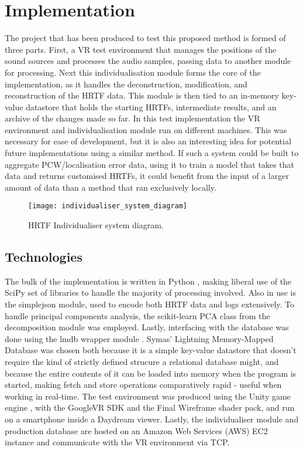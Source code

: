 \section{Implementation}
The project that has been produced to test this proposed method is formed of three parts. First, a VR test environment that manages the positions of the sound sources and processes the audio samples, passing data to another module for processing. Next this individualisation module forms the core of the implementation, as it handles the deconstruction, modification, and reconstruction of the HRTF data. This module is then tied to an in-memory key-value datastore that holds the starting HRTFs, intermediate results, and an archive of the changes made so far. In this test implementation the VR environment and individualisation module run on different machines. This was necessary for ease of development, but it is also an interesting idea for potential future implementations using a similar method. If such a system could be built to aggregate PCW/localisation error data, using it to train a model that takes that data and returns customised HRTFs, it could benefit from the input of a larger amount of data than a method that ran exclusively locally. 

\begin{figure}
	\caption{HRTF Individualiser system diagram. }
	\centering
		\texttt{[image: individualiser\_system\_diagram]}
	
\end{figure}

\subsection{Technologies}
The bulk of the implementation is written in Python \citep{GuidovanRossum}, making liberal use of the SciPy \citep{Jones2001} set of libraries to handle the majority of processing involved. Also in use is the simplejson \citep{Ippolito2017} module, used to encode both HRTF data and logs extensively. To handle principal components analysis, the scikit-learn \citep{scikit-learn} PCA class from the decomposition module was employed. Lastly, interfacing with the database was done using the lmdb wrapper module \citep{lmdbpython}. Symas' Lightning Memory-Mapped Database \citep{openldap} was chosen both because it is a simple key-value datastore that doesn't require the kind of strictly defined strucure a relational database might, and because the entire contents of it can be loaded into memory when the program is started, making fetch and store operations comparatively rapid - useful when working in real-time. The test environment was produced using the Unity game engine \citep{engine9unity}, with the GoogleVR SDK \citep{DevelopersGoogle2016} and the Final Wireframe \citep{finalwireframe} shader pack, and run on a smartphone inside a Daydream \citep{Google2016} viewer. Lastly, the individualiser module and production database are hosted on an Amazon Web Services (AWS) EC2 instance and communicate with the VR environment via TCP.

